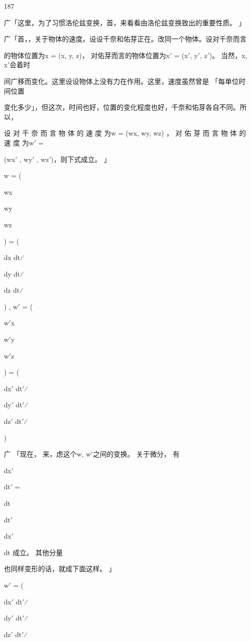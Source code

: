 187\par
广「这里，为了习惯洛伦兹变换，首，来看看由洛伦兹变换致出的重要性质。 」\par
广「首，，关于物体的速度。设设千奈和佑芽正在。改同一个物体。设对千奈而言\par
的物体位置为x = (x, y, z)， 对佑芽而言的物体位置为x$\prime$ = (x$\prime$, y$\prime$, z$\prime$)。 当然，x, x$\prime$会着时\par
间广移而变化。这里设设物体上没有力在作用。这里，速度虽然曾是 「每单位时间位置\par
变化多少」，但这次，时间也好，位置的变化程度也好，千奈和佑芽各自不同。所以，\par
设 对 千 奈 而 言 物 体 的 速 度 为w = (wx, wy, wz) ， 对 佑 芽 而 言 物 体 的 速 度 为w$\prime$ =\par
(wx$\prime$ , wy$\prime$ , wz$\prime$)，则下式成立。 」\par
w = (\par
wx\par
wy\par
wz\par
) = (\par
dx dt⁄\par
dy dt⁄\par
dz dt⁄\par
) , w$\prime$ = (\par
w$\prime$x\par
w$\prime$y\par
w$\prime$z\par
) = (\par
dx$\prime$ dt$\prime$⁄\par
dy$\prime$ dt$\prime$⁄\par
dz$\prime$ dt$\prime$⁄\par
)\par
广 「现在， 来，虑这个w, w$\prime$之间的变换。 关于微分， 有\par
dx$\prime$\par
dt$\prime$ =\par
dt\par
dt$\prime$\par
dx$\prime$\par
dt 成立。 其他分量\par
也同样变形的话，就成下面这样。 」\par
w$\prime$ = (\par
dx$\prime$ dt$\prime$⁄\par
dy$\prime$ dt$\prime$⁄\par
dz$\prime$ dt$\prime$⁄\par
